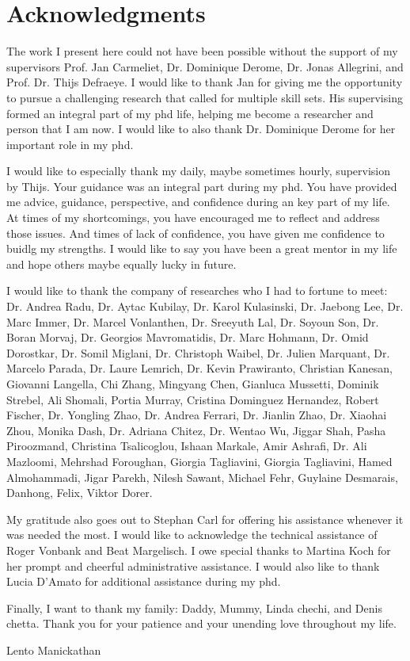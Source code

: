 
\chapter{Acknowledgments}

The work I present here could not have been possible without the support of my supervisors Prof. Jan Carmeliet, Dr. Dominique Derome, Dr. Jonas Allegrini, and Prof. Dr. Thijs Defraeye. I would like to thank Jan for giving me the opportunity to pursue a challenging research that called for multiple skill sets. His supervising formed an integral part of my phd life, helping me become a researcher and person that I am now. I would like to also thank Dr. Dominique Derome for her important role in my phd. 

I would like to especially thank my daily, maybe sometimes hourly, supervision by Thijs. Your guidance was an integral part during my phd. You have provided me advice, guidance, perspective, and confidence during an key part of my life. At times of my shortcomings, you have encouraged me to reflect and address those issues. And times of lack of confidence, you have given me confidence to buidlg my strengths. I would like to say you have been a great mentor in my life and hope others maybe equally lucky in future. 

I would like to thank the company of researches who I had to fortune to meet: Dr. Andrea Radu, Dr. Aytac Kubilay, Dr. Karol Kulasinski, Dr. Jaebong Lee, Dr. Marc Immer, Dr. Marcel Vonlanthen, Dr. Sreeyuth Lal, Dr. Soyoun Son, Dr. Boran Morvaj, Dr. Georgios Mavromatidis, Dr. Marc Hohmann, Dr. Omid Dorostkar, Dr. Somil Miglani, Dr. Christoph Waibel, Dr. Julien Marquant, Dr. Marcelo Parada, Dr. Laure Lemrich, Dr. Kevin Prawiranto, Christian Kanesan, Giovanni Langella, Chi Zhang, Mingyang Chen, Gianluca Mussetti, Dominik Strebel, Ali Shomali, Portia Murray, Cristina Dominguez Hernandez, Robert Fischer, Dr. Yongling Zhao, Dr. Andrea Ferrari, Dr. Jianlin Zhao, Dr. Xiaohai Zhou, Monika Dash, Dr. Adriana Chitez, Dr. Wentao Wu, Jiggar Shah, Pasha Piroozmand, Christina Tsalicoglou, Ishaan Markale, Amir Ashrafi, Dr. Ali Mazloomi, Mehrshad Foroughan, Giorgia Tagliavini, Giorgia Tagliavini, Hamed Almohammadi, Jigar Parekh, Nilesh Sawant, Michael Fehr, Guylaine Desmarais, Danhong, Felix, Viktor Dorer.

My gratitude also goes out to Stephan Carl for offering his assistance whenever it was needed the most. I would like to acknowledge the technical assistance of Roger Vonbank and Beat Margelisch. I owe special thanks to Martina Koch for her prompt and cheerful administrative assistance. I would also like to thank Lucia D'Amato for additional assistance during my phd.

Finally, I want to thank my family: Daddy, Mummy, Linda chechi, and Denis chetta. Thank you for your patience and your unending love throughout my life.

\begin{flushright}
Lento Manickathan\\
\myMonthYear
\end{flushright}
